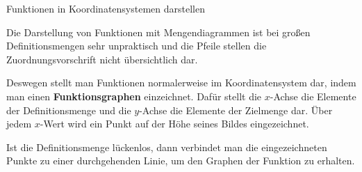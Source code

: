 \documentclass[../../main.tex]{subfiles}
\begin{document}
\begin{nutshell}{Funktionen in Koordinatensystemen darstellen}
    
    Die Darstellung von Funktionen mit Mengendiagrammen ist bei großen Definitionsmengen sehr unpraktisch und die Pfeile stellen die Zuordnungsvorschrift nicht übersichtlich dar.
    
    Deswegen stellt man Funktionen normalerweise im Koordinatensystem dar, indem man einen \textbf{Funktionsgraphen} einzeichnet. Dafür stellt die $x$-Achse die Elemente der Definitionsmenge und die $y$-Achse die Elemente der Zielmenge dar. Über jedem $x$-Wert wird ein Punkt auf der Höhe seines Bildes eingezeichnet. 
    
    Ist die Definitionsmenge lückenlos, dann verbindet man die eingezeichneten Punkte zu einer durchgehenden Linie, um den Graphen der Funktion zu erhalten.
\end{nutshell}
\end{document}
